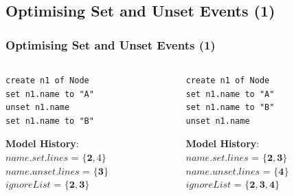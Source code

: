 \documentclass{beamer}
\begin{document}
\begin{frame}[fragile]
\section{Optimising Set and Unset Events (1)}
\frametitle{Optimising Set and Unset Events (1)}
\begin{columns}
\begin{column}[t]{0.49\linewidth}
\begin{lstlisting}[style=eol,caption={A CBP representation of attribute \emph{name} assignments ended with SET.},label=lst:set_unset_example_1]
create n1 of Node
set n1.name to "A"
unset n1.name
set n1.name to "B"
\end{lstlisting}

\textbf{\footnotesize Model History}:\\
$name$.$set$.$lines$ = $\{\boldsymbol{2},4\}$\\
$name$.$unset$.$lines$ = $\{\boldsymbol{3}\}$\\
$ignoreList$ = $\{\boldsymbol{2}, \boldsymbol{3}\}$

\end{column}
\begin{column}[t]{0.49\linewidth}
\begin{lstlisting}[style=eol,caption={A CBP representation of attribute \emph{name} assignments ended with UNSET.},label=lst:set_unset_example_2]
create n1 of Node
set n1.name to "A"
set n1.name to "B"
unset n1.name
\end{lstlisting}

\textbf{\footnotesize Model History}:\\
$name$.$set$.$lines$ = $\{\boldsymbol{2},\boldsymbol{3}\}$\\ 
$name$.$unset$.$lines$ = $\{\boldsymbol{4}\}$\\
$ignoreList$ = $\{\boldsymbol{2}, \boldsymbol{3}, \boldsymbol{4}\}$

\end{column}
\end{columns}
\end{frame}
\end{document}
